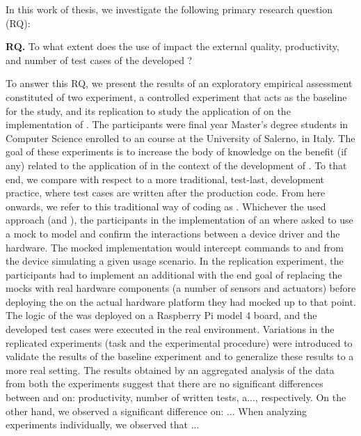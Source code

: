 In this work of thesis, we investigate the following primary research question (RQ):

\begin{framed}
\noindent \textbf{RQ.} To what extent does the use of \tdd impact the external quality, productivity, and number of test cases of the developed \es?	
\end{framed}

To answer this RQ, we present the results of an exploratory empirical assessment constituted of two experiment, a controlled experiment that acts as the baseline for the study, and its replication to study the application of \tdd on the implementation of \ess. The participants were final year Master's degree students in Computer Science enrolled to an \es course at the University of Salerno, in Italy. The goal of these experiments is to increase the body of knowledge on the benefit (if any) related to the application of \tdd in the context of the development of \ess. To that end, we compare \tdd with respect to a more traditional, test-last, development practice, where test cases are written after the production code. From here onwards, we refer to this traditional way of coding as \notdd. Whichever the used approach (\tdd and \notdd), the participants in the implementation of an \es where asked to use a mock to model and confirm the interactions between a device driver and the hardware. The mocked implementation would intercept commands to and from the device simulating a given usage scenario. In the replication experiment, the participants had to implement an additional \es with the end goal of replacing the mocks with real hardware components (a number of sensors and actuators) before deploying the \es on the actual hardware platform they had mocked up to that point. The logic of the \es was deployed on a Raspberry Pi model 4 board, and the developed test cases were executed in the real environment. Variations in the replicated experiments (task and the experimental procedure) were introduced to validate the results of the baseline experiment and to generalize these results to a more real setting. The results obtained by an aggregated analysis of the data from both the experiments suggest that there are no significant differences between \tdd and \notdd on: productivity, number of written tests, a..., respectively. On the other hand, we observed a significant difference on: ... When analyzing experiments individually, we observed that ...

